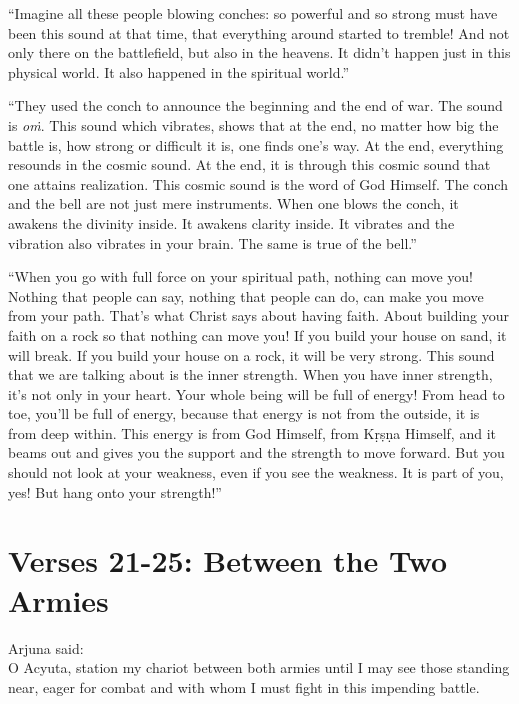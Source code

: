 \enquote{Imagine all these people blowing conches: so powerful and so strong must have been this sound at that time, that everything around started to tremble! And not only there on the battlefield, but also in the heavens. It didn’t happen just in this physical world. It also happened in the spiritual world.}


\enquote{They used the conch to announce the beginning and the end of war. The sound is \textit{oṁ}. This sound which vibrates, shows that at the end, no matter how big the battle is, how strong or difficult it is, one finds one’s way. At the end, everything resounds in the cosmic sound. At the end, it is through this cosmic sound that one attains realization. This cosmic sound is the word of God Himself. The conch and the bell are not just mere instruments. When one blows the conch, it awakens the divinity inside. It awakens clarity inside. It vibrates and the vibration also vibrates in your brain. The same is true of the bell.}

\enquote{When you go with full force on your spiritual path, nothing can move you! Nothing that people can say, nothing that people can do, can make you move from your path. That’s what Christ says about having faith. About building your faith on a rock so that nothing can move you! If you build your house on sand, it will break. If you build your house on a rock, it will be very strong. This sound that we are talking about is the inner strength. When you have inner strength, it’s not only in your heart. Your whole being will be full of energy! From head to toe, you’ll be full of energy, because that energy is not from the outside, it is from deep within. This energy is from God Himself, from Kṛṣṇa Himself, and it beams out and gives you the support and the strength to move forward. But you should not look at your weakness, even if you see the weakness. It is part of you, yes! But hang onto your strength!}

\newpage
\section{Verses 21-25: Between the Two Armies}\label{sec-verses-21-25-between-the-two-armies}

{\hspace*{1em}Arjuna said: \\
O Acyuta, station my chariot between both armies until I may see those standing near, eager for combat and with whom I must fight in this impending battle.}

